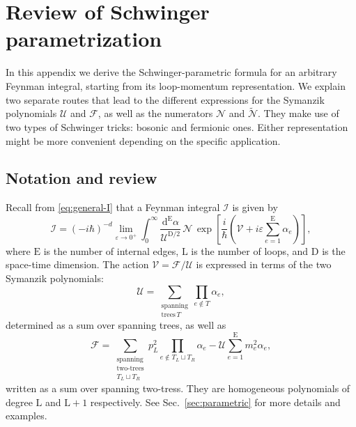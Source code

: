 \documentclass[12pt]{article}
\numberwithin{figure}{section}
\def \be {\begin{equation}}
\def \ee {\end{equation}}
\def \D {\mathrm{D}}
\def \E {\mathrm{E}}
\def \L {\mathrm{L}}
\def \U {\mathcal{U}}
\def \F {\mathcal{F}}
\def \d {\mathrm{d}}
\def \eps {\varepsilon}
\def \V {\mathcal{V}}
\def \I {\mathcal{I}}
\def \N {\mathcal{N}}
\begin{document}
\appendix

\newpage
\section{\label{app:parametric}Review of Schwinger parametrization}

In this appendix we derive the Schwinger-parametric formula for an arbitrary Feynman integral, starting from its loop-momentum representation. We explain two separate routes that lead to the different expressions for the Symanzik polynomials $\mathcal{U}$ and $\mathcal{F}$, as well as the numerators $\mathcal{N}$ and $\widetilde{\mathcal{N}}$. They make use of two types of Schwinger tricks: bosonic and fermionic ones. Either representation might be more convenient depending on the specific application.

\subsection{Notation and review}

Recall from \eqref{eq:general-I} that a Feynman integral $\I$ is given by
%
\be\label{eq:general-I2}
\I = (-i\hbar)^{-d} \lim_{\eps \to 0^+} \int_0^\infty \frac{\d^{\E} \alpha}{\U^{\D/2}}\, \N\, \exp \left[ \frac{i}{\hbar} \left(\V + i\eps \textstyle\sum_{e=1}^{\E}\alpha_e \right)\right],
\ee
%
where $\E$ is the number of internal edges, $\L$ is the number of loops, and $\D$ is the space-time dimension. The action $\V = \F/\U$ is expressed in terms of the two Symanzik polynomials:
%
\be\label{eq:U2}
\U = \sum_{\substack{\mathrm{spanning}\\ \mathrm{trees }\,T}} \prod_{e \notin T} \alpha_e,
\ee
%
determined as a sum over spanning trees, as well as
%
\be\label{eq:F2}
\F = \sum_{\substack{\mathrm{spanning}\\ \text{two-trees}\\ T_L \sqcup T_R}} p_L^2 \prod_{e \notin T_L \sqcup T_R} \alpha_e - \U \sum_{e=1}^{\E} m_e^2 \alpha_e,
\ee
%
written as a sum over spanning two-tress. They are homogeneous polynomials of degree $\L$ and $\L{+}1$ respectively. See Sec.~\ref{sec:parametric} for more details and examples.
\end{document}
